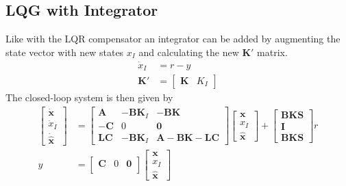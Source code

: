\subsection{LQG with Integrator}
Like with the LQR compensator an integrator can be added by augmenting the state vector with new states $x_I$ and calculating the new $\mathbf{K'}$ matrix.
\begin{align*}
    \dot{x}_I & = r - y                      \\
    \mathbf{K'}        & = \begin{bmatrix}
                               \mathbf{K} & K_I
                           \end{bmatrix}
\end{align*}
The closed-loop system is then given by
\begin{align*}
    \begin{bmatrix}
        \dot{\mathbf{x}}   \\
        \dot{x}_I \\
        \dot{\hat{\textbf{x}}}
    \end{bmatrix}
      & =
    \begin{bmatrix}
        \mathbf{A}  & \mathbf{-BK}_I & \mathbf{-BK}     \\
        \mathbf{-C} & 0              & \mathbf{0}                \\
        \mathbf{LC} & \mathbf{-BK}_I & \mathbf{A-BK-LC}
    \end{bmatrix}
    \begin{bmatrix}
        \mathbf{x}   \\
        x_I \\
        \hat{\textbf{x}}
    \end{bmatrix}
    +
    \begin{bmatrix}
        \mathbf{BKS} \\
        \mathbf{I}   \\
        \mathbf{BKS}
    \end{bmatrix}
    r                           \\
    y & = \begin{bmatrix}
              \mathbf{C} & 0 & \mathbf{0} \\
          \end{bmatrix}
    \begin{bmatrix}
        \mathbf{x}   \\
        x_I \\
        \hat{\textbf{x}}
    \end{bmatrix}
\end{align*}

